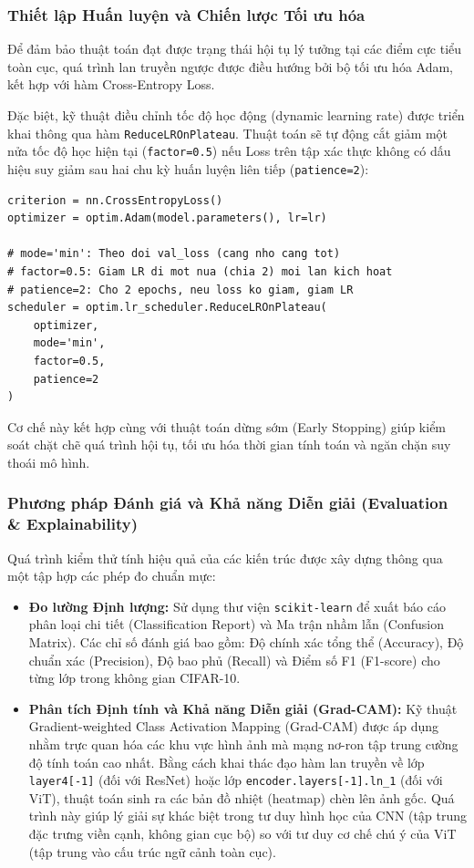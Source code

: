 \documentclass[a4paper]{article}
\theoremstyle{definition}
\begin{document}
\subsubsection{Thiết lập Huấn luyện và Chiến lược Tối ưu hóa}

Để đảm bảo thuật toán đạt được trạng thái hội tụ lý tưởng tại các điểm cực tiểu toàn cục, quá trình lan truyền ngược được điều hướng bởi bộ tối ưu hóa Adam, kết hợp với hàm Cross-Entropy Loss.

Đặc biệt, kỹ thuật điều chỉnh tốc độ học động (dynamic learning rate) được triển khai thông qua hàm \texttt{ReduceLROnPlateau}. Thuật toán sẽ tự động cắt giảm một nửa tốc độ học hiện tại (\texttt{factor=0.5}) nếu Loss trên tập xác thực không có dấu hiệu suy giảm sau hai chu kỳ huấn luyện liên tiếp (\texttt{patience=2}):

\begin{verbatim}
criterion = nn.CrossEntropyLoss()
optimizer = optim.Adam(model.parameters(), lr=lr)

# mode='min': Theo doi val_loss (cang nho cang tot)
# factor=0.5: Giam LR di mot nua (chia 2) moi lan kich hoat
# patience=2: Cho 2 epochs, neu loss ko giam, giam LR
scheduler = optim.lr_scheduler.ReduceLROnPlateau(
    optimizer, 
    mode='min', 
    factor=0.5, 
    patience=2
)
\end{verbatim}

Cơ chế này kết hợp cùng với thuật toán dừng sớm (Early Stopping) giúp kiểm soát chặt chẽ quá trình hội tụ, tối ưu hóa thời gian tính toán và ngăn chặn suy thoái mô hình.

\subsubsection{Phương pháp Đánh giá và Khả năng Diễn giải (Evaluation \& Explainability)}

Quá trình kiểm thử tính hiệu quả của các kiến trúc được xây dựng thông qua một tập hợp các phép đo chuẩn mực:
\begin{itemize}
	\item \textbf{Đo lường Định lượng:} Sử dụng thư viện \texttt{scikit-learn} để xuất báo cáo phân loại chi tiết (Classification Report) và Ma trận nhầm lẫn (Confusion Matrix). Các chỉ số đánh giá bao gồm: Độ chính xác tổng thể (Accuracy), Độ chuẩn xác (Precision), Độ bao phủ (Recall) và Điểm số F1 (F1-score) cho từng lớp trong không gian CIFAR-10.
	\item \textbf{Phân tích Định tính và Khả năng Diễn giải (Grad-CAM):} Kỹ thuật Gradient-weighted Class Activation Mapping (Grad-CAM) được áp dụng nhằm trực quan hóa các khu vực hình ảnh mà mạng nơ-ron tập trung cường độ tính toán cao nhất. Bằng cách khai thác đạo hàm lan truyền về lớp \texttt{layer4[-1]} (đối với ResNet) hoặc lớp \texttt{encoder.layers[-1].ln\_1} (đối với ViT), thuật toán sinh ra các bản đồ nhiệt (heatmap) chèn lên ảnh gốc. Quá trình này giúp lý giải sự khác biệt trong tư duy hình học của CNN (tập trung đặc trưng viền cạnh, không gian cục bộ) so với tư duy cơ chế chú ý của ViT (tập trung vào cấu trúc ngữ cảnh toàn cục).
\end{itemize}
\end{document}
